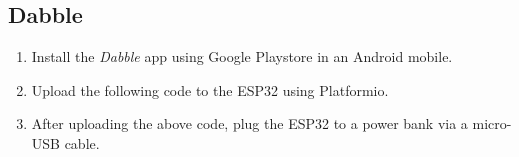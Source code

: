 \documentclass[conference]{IEEEtran}
\begin{document}
\subsection{Dabble}
\begin{enumerate}

\item Install the {\em Dabble} app using Google Playstore in an Android mobile.
\item Upload the following code to the ESP32 using Platformio.
\item After uploading the above code, plug the ESP32 to a power bank via a micro-USB cable.


\end{enumerate}
\end{document}
